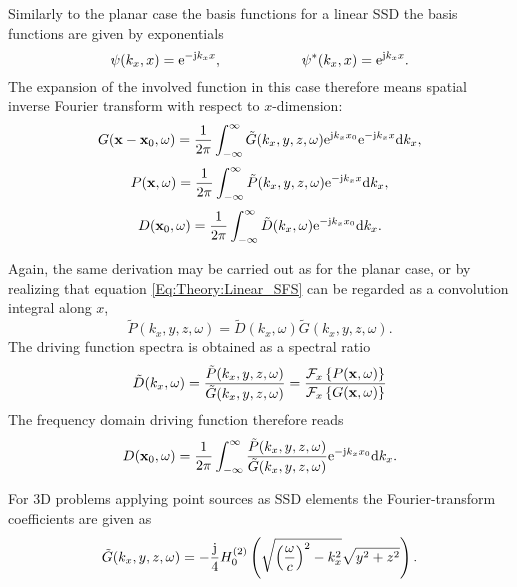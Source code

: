 Similarly to the planar case the basis functions for a linear SSD the basis functions are given by exponentials
\begin{equation}
\psi(k_x,x) = \mathrm{e}^{-\mathrm{j} k_x x}, \hspace{2cm} \psi^*(k_x,x) = \mathrm{e}^{\mathrm{j} k_x x}.
\end{equation}
The expansion of the involved function in this case therefore means spatial inverse Fourier transform with respect to $x$-dimension:
\begin{equation}
G(\mathbf{x} - \mathbf{x}_0,\omega) = \frac{1}{2\pi} \int_{-\infty}^{\infty} \tilde{G}(k_x,y,z, \omega)  \mathrm{e}^{\mathrm{j} k_x x_0} \mathrm{e}^{-\mathrm{j} k_x x} \mathrm{d} k_x,
\end{equation}
\begin{equation}
P(\mathbf{x},\omega) = \frac{1}{2\pi} \int_{-\infty}^{\infty} \tilde{P}(k_x,y,z, \omega) \mathrm{e}^{-\mathrm{j} k_x x} \mathrm{d} k_x,
\end{equation}
\begin{equation}
D(\mathbf{x}_0,\omega) = \frac{1}{2\pi} \int_{-\infty}^{\infty} \tilde{D}(k_x, \omega) \mathrm{e}^{-\mathrm{j} k_x x_0 } \mathrm{d} k_x.
\end{equation} 

Again, the same derivation may be carried out as for the planar case, or by realizing that equation \eqref{Eq:Theory:Linear_SFS} can be regarded as a convolution integral along $x$, 
\begin{equation}
\tilde{P}(k_x,y,z, \omega) = \tilde{D}(k_x,\omega)\tilde{G}(k_x,y,z, \omega).
\end{equation}
The driving function spectra is obtained as a spectral ratio
\begin{equation}
\tilde{D}(k_x,\omega) = \frac{\tilde{P}(k_x,y,z, \omega)}{\tilde{G}(k_x,y,z, \omega)} = \frac{\mathcal{F}_x\left\{ P(\mathbf{x},\omega) \right\}}{\mathcal{F}_x\left\{ G(\mathbf{x},\omega) \right\}}
\end{equation}
The frequency domain driving function therefore reads
\begin{equation}
D(\mathbf{x}_0,\omega) = \frac{1}{2\pi} \int_{-\infty}^{\infty} \frac{\tilde{P}(k_x,y,z, \omega) }{\tilde{G}(k_x,y,z, \omega)} \mathrm{e}^{-\mathrm{j} k_x x_0} \mathrm{d} k_x.
\end{equation}

\vspace{3mm}
For 3D problems applying point sources as SSD elements the Fourier-transform coefficients are given as
\begin{equation}
\tilde{G}(k_x,y,z,\omega) = -\frac{\mathrm{j}}{4} H_0^{(2)}\left( \sqrt{ \left( \frac{\omega}{c} \right)^2 - k_x^2 } \sqrt{ y^2 + z^2 } \right).
\end{equation}

